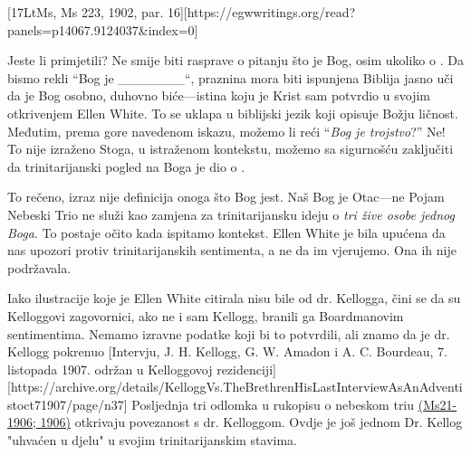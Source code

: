 [17LtMs, Ms 223, 1902, par. 16][https://egwwritings.org/read?panels=p14067.9124037&index=0]

Jeste li primjetili? Ne smije biti rasprave o pitanju što je Bog, osim ukoliko  o . Da bismo rekli “Bog je \_\_\_\_\_\_\_“, praznina mora biti ispunjena  Biblija jasno uči da je Bog osobno, duhovno biće—istina koju je Krist sam potvrdio u svojim otkrivenjem Ellen White. To se uklapa u biblijski jezik koji opisuje Božju ličnost. Međutim, prema gore navedenom iskazu, možemo li reći “\textit{Bog je trojstvo}?” Ne! To nije izraženo  Stoga, u istraženom kontekstu, možemo sa sigurnošću zaključiti da trinitarijanski pogled na Boga je dio  o .

To rečeno, izraz  nije definicija onoga što Bog jest. Naš Bog je Otac—ne  Pojam Nebeski Trio ne služi kao zamjena za trinitarijansku ideju o \textit{tri žive osobe jednog Boga}. To postaje očito kada ispitamo kontekst. Ellen White je bila upućena da nas upozori protiv trinitarijanskih sentimenta, a ne da im vjerujemo. Ona ih nije podržavala.

Iako ilustracije koje je Ellen White citirala nisu bile od dr. Kellogga, čini se da su Kelloggovi zagovornici, ako ne i sam Kellogg, branili ga Boardmanovim sentimentima. Nemamo izravne podatke koji bi to potvrdili, ali znamo da je dr. Kellogg pokrenuo [Intervju, J. H. Kellogg, G. W. Amadon i A. C. Bourdeau, 7. listopada 1907. održan u Kelloggovoj rezidenciji][https://archive.org/details/KelloggVs.TheBrethrenHisLastInterviewAsAnAdventistoct71907/page/n37] Posljednja tri odlomka u rukopisu o nebeskom triu \href{https://egwwritings.org/?ref=en_Ms21-1906&para=9754.1}{(Ms21-1906; 1906)} otkrivaju povezanost s dr. Kelloggom. Ovdje je još jednom Dr. Kellog "uhvaćen u djelu" u svojim trinitarijanskim stavima.

